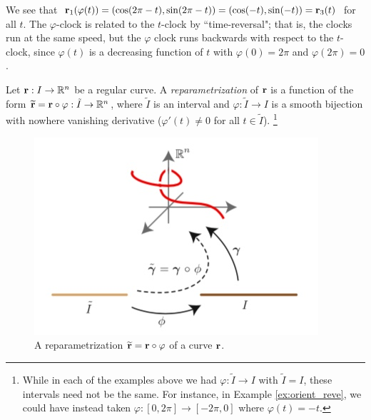 \documentclass[12pt,letterpaper,reqno]{article}
\numberwithin{equation}{section}
\newcommand{\bbr}{{\bf r}}
\begin{document}
{{\color{red}
\begin{solution}
We see that $\bbr_1(\varphi(t))=(\cos(2\pi-t),\sin(2\pi-t))=(\cos(-t),\sin(-t))=\bbr_3(t)$ for all $t$. The $\varphi$-clock is related to the $t$-clock by ``time-reversal"; that is, the clocks run at the same speed, but the $\varphi$ clock runs backwards with respect to the $t$-clock, since $\varphi(t)$ is a decreasing function of $t$ with $\varphi(0)=2\pi$ and $\varphi(2\pi)=0$.	
\end{solution}
}
\begin{defn}[Reparametrization]
	Let $\bbr:I \to \mathbb{R}^n$ be a regular curve. A \emph{reparametrization} of $\bbr$ is a function of the form $\widetilde{\bbr}=\bbr \circ \varphi:\tilde{I} \to \mathbb{R}^n$, where $\tilde{I}$ is an interval and $\varphi:\tilde{I} \to I$ is a smooth bijection with nowhere vanishing derivative ($\varphi'(t) \neq 0$ for all $t \in \tilde{I}$). \footnote{While in each of the examples above we had $\varphi:\tilde{I} \to I$ with $\tilde{I}=I$, these intervals need not be the same. For instance, in Example \ref{ex:orient_reve}, we could have instead taken $\varphi:[0,2\pi] \to [-2\pi,0]$ where $\varphi(t)=-t$.}
\end{defn}

\begin{figure}[h]
	\begin{center}
		\includegraphics[scale=0.5]{figures_mvc/reparametrization}
	\end{center}
	\caption{A reparametrization $\widetilde{\bbr}=\bbr \circ \varphi$ of a curve $\bbr$.}
\end{figure}

}
\end{document}
